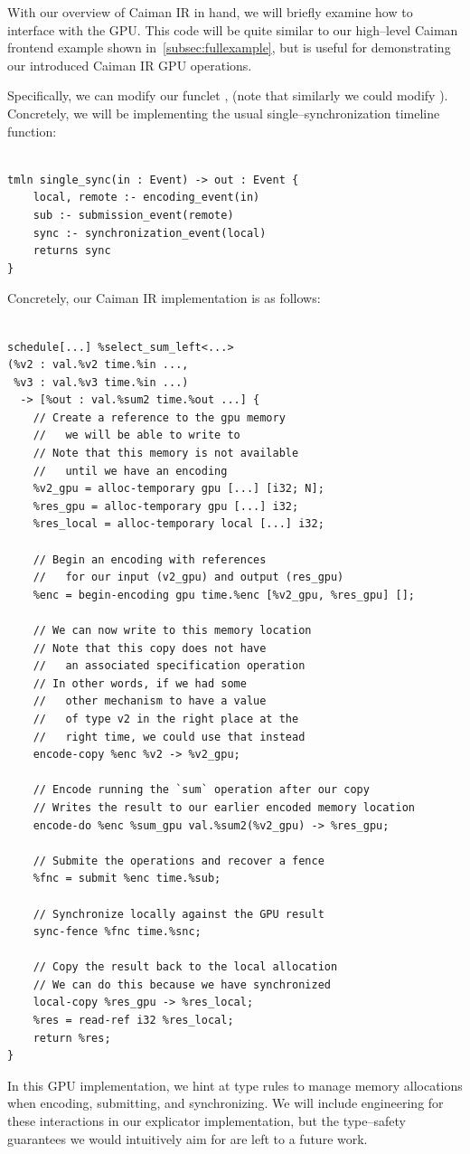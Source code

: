 With our overview of Caiman IR in hand, we will briefly examine how to interface with the GPU.  This code will be quite similar to our high--level Caiman frontend example shown in~\ref{subsec:fullexample}, but is useful for demonstrating our introduced Caiman IR GPU operations.

Specifically, we can modify our funclet , (note that similarly we could modify ).  Concretely, we will be implementing the usual single--synchronization timeline function:
%
\begin{lstlisting}

tmln single_sync(in : Event) -> out : Event {
    local, remote :- encoding_event(in)
    sub :- submission_event(remote)
    sync :- synchronization_event(local)
    returns sync
}
\end{lstlisting}
%
Concretely, our Caiman IR implementation is as follows:
%
\begin{lstlisting}

schedule[...] %select_sum_left<...>
(%v2 : val.%v2 time.%in ..., 
 %v3 : val.%v3 time.%in ...) 
  -> [%out : val.%sum2 time.%out ...] {
    // Create a reference to the gpu memory 
    //   we will be able to write to
    // Note that this memory is not available 
    //   until we have an encoding
    %v2_gpu = alloc-temporary gpu [...] [i32; N];
    %res_gpu = alloc-temporary gpu [...] i32;
    %res_local = alloc-temporary local [...] i32;
    
    // Begin an encoding with references 
    //   for our input (v2_gpu) and output (res_gpu)
    %enc = begin-encoding gpu time.%enc [%v2_gpu, %res_gpu] [];
    
    // We can now write to this memory location
    // Note that this copy does not have 
    //   an associated specification operation
    // In other words, if we had some 
    //   other mechanism to have a value
    //   of type v2 in the right place at the 
    //   right time, we could use that instead
    encode-copy %enc %v2 -> %v2_gpu;
    
    // Encode running the `sum` operation after our copy
    // Writes the result to our earlier encoded memory location
    encode-do %enc %sum_gpu val.%sum2(%v2_gpu) -> %res_gpu;
    
    // Submite the operations and recover a fence
    %fnc = submit %enc time.%sub;
    
    // Synchronize locally against the GPU result
    sync-fence %fnc time.%snc;
    
    // Copy the result back to the local allocation
    // We can do this because we have synchronized
    local-copy %res_gpu -> %res_local;
    %res = read-ref i32 %res_local;
    return %res;
}
\end{lstlisting}
%
In this GPU implementation, we hint at type rules to manage memory allocations when encoding, submitting, and synchronizing.  We will include engineering for these interactions in our explicator implementation, but the type--safety guarantees we would intuitively aim for are left to a future work.

